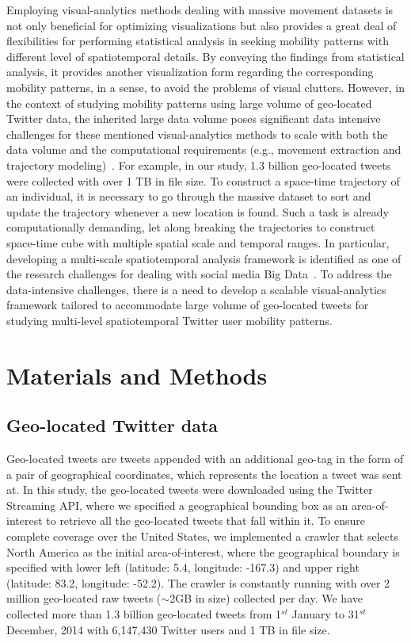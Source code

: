 \documentclass[ijgi,article,submit,moreauthors,pdftex,10pt,a4paper]{mdpi}
\theoremstyle{mdpi}
\newcounter{ex}
\newcounter{re}
\theoremstyle{mdpidefinition}
\begin{document}
Employing visual-analytics methods dealing with massive movement datasets is not only beneficial for optimizing visualizations but also provides a great deal of flexibilities for performing statistical analysis in seeking mobility patterns with different level of spatiotemporal details. 
By conveying the findings from statistical analysis, it provides another visualization form regarding the corresponding mobility patterns, in a sense, to avoid the problems of visual clutters.
However, in the context of studying mobility patterns using large volume of geo-located Twitter data, the inherited large data volume poses significant data intensive challenges for these mentioned visual-analytics methods to scale with both the data volume and the computational requirements (e.g., movement extraction and trajectory modeling)~\cite{cao2014scalable}.
For example, in our study, 1.3 billion geo-located tweets were collected with over 1 TB in file size.
To construct a space-time trajectory of an individual, it is necessary to go through the massive dataset to sort and update the trajectory whenever a new location is found. 
Such a task is already computationally demanding, let along breaking the trajectories to construct space-time cube with multiple spatial scale and temporal ranges. 
In particular, developing a multi-scale spatiotemporal analysis framework is identified as one of the research challenges for dealing with social media Big Data~\cite{tsou2015}. 
To address the data-intensive challenges, there is a need to develop a scalable visual-analytics framework tailored to accommodate large volume of geo-located tweets for studying multi-level spatiotemporal Twitter user mobility patterns.


\section{Materials and Methods}
\subsection{Geo-located Twitter data}
Geo-located tweets are tweets appended with an additional geo-tag in the form of a pair of geographical coordinates, which represents the location a tweet was sent at. 
In this study, the geo-located tweets were downloaded using the Twitter Streaming API, where we specified a geographical bounding box as an area-of-interest to retrieve all the geo-located tweets that fall within it. 
To ensure complete coverage over the United States, we implemented a crawler that selects North America as the initial area-of-interest, where the geographical boundary is specified with lower left (latitude: 5.4, longitude: -167.3) and upper right (latitude: 83.2, longitude: -52.2).
The crawler is constantly running with over 2 million geo-located raw tweets ($\sim$2GB in size) collected per day.
We have collected more than 1.3 billion geo-located tweets from 1$^{st}$ January to 31$^{st}$ December, 2014 with 6,147,430 Twitter users and 1 TB in file size.
\end{document}
